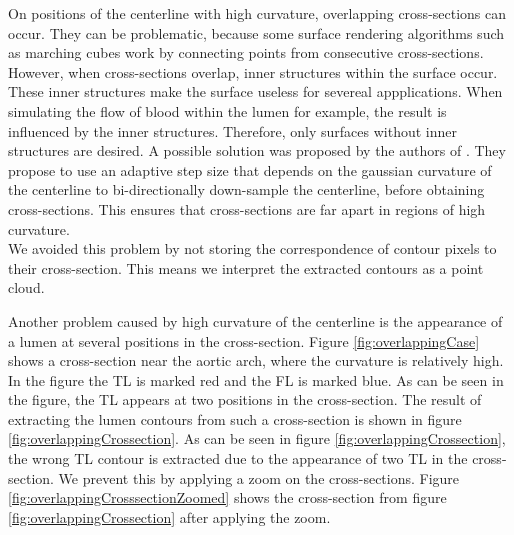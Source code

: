 \documentclass[thesis.tex]{subfiles}
\begin{document}
On positions of the centerline with high curvature, overlapping cross-sections can occur. They can be problematic, because some surface rendering algorithms such as marching cubes work by connecting points from consecutive cross-sections. However, when cross-sections overlap, inner structures within the surface occur. These inner structures make the surface useless for severeal appplications. When simulating the flow of blood within the lumen for example, the result is influenced by the inner structures. Therefore, only surfaces without inner structures are desired. A possible solution was proposed by the authors of \cite{wu2010curvature}. They propose to use an adaptive step size that depends on the gaussian curvature of the centerline to bi-directionally down-sample the centerline, before obtaining cross-sections. This ensures that cross-sections are far apart in regions of high curvature. \\
We avoided this problem by not storing the correspondence of contour pixels to their cross-section. This means we interpret the extracted contours as a point cloud.

Another problem caused by high curvature of the centerline is the appearance of a lumen at several positions in the cross-section. Figure \ref{fig:overlappingCase} shows a cross-section near the aortic arch, where the curvature is relatively high. In the figure the TL is marked red and the FL is marked blue. As can be seen in the figure, the TL appears at two positions in the cross-section. The result of extracting the lumen contours from such a cross-section is shown in figure \ref{fig:overlappingCrossection}. As can be seen in figure \ref{fig:overlappingCrossection}, the wrong TL contour is extracted due to the appearance of two TL in the cross-section. We prevent this by applying a zoom on the cross-sections. Figure \ref{fig:overlappingCrosssectionZoomed} shows the cross-section from figure \ref{fig:overlappingCrossection} after applying the zoom.
\end{document}
